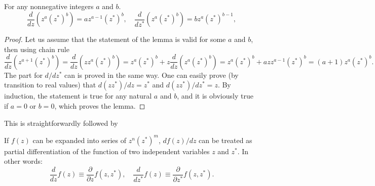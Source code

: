\begin{lemma}
For any nonnegative integers $a$ and $b$.
\[
	\frac{d}{dz} (z^a (z^*)^b) = a z^{a-1} (z^*)^b,
	\quad
	\frac{d}{dz^*} (z^a (z^*)^b) = b z^a (z^*)^{b-1},
\]
\end{lemma}
\begin{proof}
Let us assume that the statement of the lemma is valid for some $a$ and $b$, then using chain rule
\[
	\frac{d}{dz} (z^{a+1} (z^*)^b)
	= \frac{d}{dz} (z z^a (z^*)^b)
	= z^a (z^*)^b + z \frac{d}{dz} (z^a (z^*)^b)
	= z^a (z^*)^b + a z z^{a-1} (z^*)^b
	= (a + 1) z^a (z^*)^b.
\]
The part for $d/dz^*$ can is proved in the same way.
One can easily prove (by transition to real values) that $d(z z^*)/dz = z^*$ and $d(z z^*)/dz^* = z$.
By induction, the statement is true for any natural $a$ and $b$,
and it is obviously true if $a = 0$ or $b = 0$, which proves the lemma.
\end{proof}

This is straightforwardly followed by
\begin{lemma}
If $f(z)$ can be expanded into series of $z^n (z^*)^m$, $df(z)/dz$ can be treated as partial differentiation of the function of two independent variables $z$ and $z^*$.
In other words:
\[
	\frac{d}{dz} f(z) \equiv \frac{\partial}{\partial z} f(z, z^*),
	\quad
	\frac{d}{dz^*} f(z) \equiv \frac{\partial}{\partial z^*} f(z, z^*).
\]
\end{lemma}

